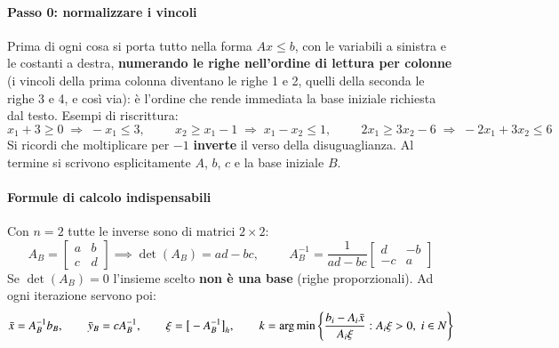 \documentclass[12pt]{extarticle} %
\begin{document}
\paragraph{Passo 0: normalizzare i vincoli}
Prima di ogni cosa si porta tutto nella forma $Ax \le b$, con le variabili a sinistra e le costanti a destra, \textbf{numerando le righe nell'ordine di lettura per colonne} (i vincoli della prima colonna diventano le righe 1 e 2, quelli della seconda le righe 3 e 4, e così via): è l'ordine che rende immediata la base iniziale richiesta dal testo. Esempi di riscrittura:
\[
x_1 + 3 \ge 0 \;\Longrightarrow\; -x_1 \le 3, \hspace{1cm}
x_2 \ge x_1 - 1 \;\Longrightarrow\; x_1 - x_2 \le 1, \hspace{1cm}
2x_1 \ge 3x_2 - 6 \;\Longrightarrow\; -2x_1 + 3x_2 \le 6
\]
Si ricordi che moltiplicare per $-1$ \textbf{inverte} il verso della disuguaglianza. Al termine si scrivono esplicitamente $A$, $b$, $c$ e la base iniziale $B$.

\paragraph{Formule di calcolo indispensabili}
Con $n=2$ tutte le inverse sono di matrici $2\times 2$:
\[
A_B = \begin{bmatrix} a & b\\ c& d\end{bmatrix} \implies \det(A_B) = ad-bc, \hspace{1cm} A_B^{-1} = \frac{1}{ad-bc}\begin{bmatrix} d & -b\\ -c & a\end{bmatrix}
\]
Se $\det(A_B)=0$ l'insieme scelto \textbf{non è una base} (righe proporzionali). Ad ogni iterazione servono poi:
\[
\bar{x} = A_B^{-1}b_B, \hspace{0.7cm} \bar{y}_B = cA_B^{-1}, \hspace{0.7cm} \xi = \big[-A_B^{-1}\big]_h, \hspace{0.7cm} k = \arg\min\left\{\frac{b_i - A_i\bar{x}}{A_i\xi} : A_i\xi > 0,\; i \in N\right\}
\]
\end{document}
